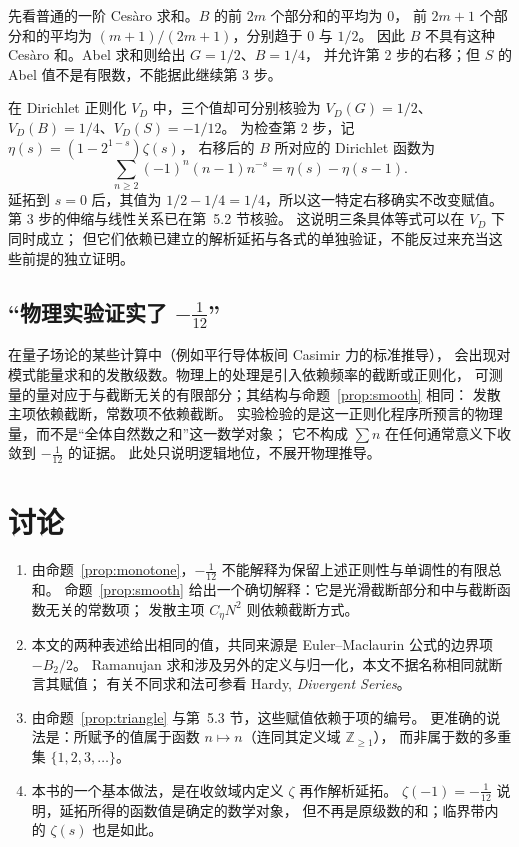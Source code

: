 \documentclass[11pt]{article}
\begin{document}
先看普通的一阶 Cesàro 求和。$B$ 的前 $2m$ 个部分和的平均为 $0$，
前 $2m+1$ 个部分和的平均为 $(m+1)/(2m+1)$，分别趋于 $0$ 与 $1/2$。
因此 $B$ 不具有这种 Cesàro 和。Abel 求和则给出 $G=1/2$、$B=1/4$，
并允许第 2 步的右移；但 $S$ 的 Abel 值不是有限数，不能据此继续第 3 步。

在 Dirichlet 正则化 $V_D$ 中，三个值却可分别核验为
$V_D(G)=1/2$、$V_D(B)=1/4$、$V_D(S)=-1/12$。
为检查第 2 步，记 $\eta(s)=(1-2^{1-s})\zeta(s)$，
右移后的 $B$ 所对应的 Dirichlet 函数为
\[
 \sum_{n\ge2}(-1)^n(n-1)n^{-s}=\eta(s)-\eta(s-1).
\]
延拓到 $s=0$ 后，其值为 $1/2-1/4=1/4$，所以这一特定右移确实不改变赋值。
第 3 步的伸缩与线性关系已在第~5.2 节核验。
这说明三条具体等式可以在 $V_D$ 下同时成立；
但它们依赖已建立的解析延拓与各式的单独验证，不能反过来充当这些前提的独立证明。

\subsection{\texorpdfstring{“物理实验证实了 $-\tfrac1{12}$”}{“物理实验证实了 −1/12”}}
在量子场论的某些计算中（例如平行导体板间 Casimir 力的标准推导），
会出现对模式能量求和的发散级数。物理上的处理是引入依赖频率的截断或正则化，
可测量的量对应于与截断无关的有限部分；其结构与命题~\ref{prop:smooth} 相同：
发散主项依赖截断，常数项不依赖截断。
实验检验的是这一正则化程序所预言的物理量，而不是“全体自然数之和”这一数学对象；
它不构成 $\sum n$ 在任何通常意义下收敛到 $-\tfrac1{12}$ 的证据。
此处只说明逻辑地位，不展开物理推导。

\section{讨论}
\begin{enumerate}
 \item 由命题~\ref{prop:monotone}，$-\tfrac1{12}$ 不能解释为保留上述正则性与单调性的有限总和。
 命题~\ref{prop:smooth} 给出一个确切解释：它是光滑截断部分和中与截断函数无关的常数项；
 发散主项 $C_\eta N^2$ 则依赖截断方式。
 \item 本文的两种表述给出相同的值，共同来源是 Euler--Maclaurin 公式的边界项 $-B_2/2$。
 Ramanujan 求和涉及另外的定义与归一化，本文不据名称相同就断言其赋值；
 有关不同求和法可参看 Hardy, \emph{Divergent Series}。
 \item 由命题~\ref{prop:triangle} 与第~5.3 节，这些赋值依赖于项的编号。
 更准确的说法是：所赋予的值属于函数 $n\mapsto n$（连同其定义域 $\mathbb Z_{\ge1}$），
 而非属于数的多重集 $\{1,2,3,\ldots\}$。
 \item 本书的一个基本做法，是在收敛域内定义 $\zeta$ 再作解析延拓。
 $\zeta(-1)=-\tfrac1{12}$ 说明，延拓所得的函数值是确定的数学对象，
 但不再是原级数的和；临界带内的 $\zeta(s)$ 也是如此。
\end{enumerate}
\end{document}
